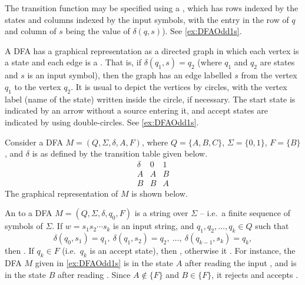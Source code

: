 The transition function may be specified using a , which has rows indexed by the states and columns indexed by the input symbols, with the entry in the row of $q$ and column of $s$ being the value of $\delta(q, s)$). See \cref{ex:DFAOdd1s}.

A DFA has a graphical representation as a directed graph in which each vertex is a state and each edge is a . That is, if $\delta(q_1, s) = q_2$ (where $q_1$ and $q_2$ are states and $s$ is an input symbol), then the graph has an edge labelled $s$ from the vertex $q_1$ to the vertex $q_2$. It is usual to depict the vertices by circles, with the vertex label (name of the state) written inside the circle, if necessary. The start state is indicated by an arrow without a source entering it, and accept states are indicated by using double-circles. See \cref{ex:DFAOdd1s}.

\begin{Example}\label{ex:DFAOdd1s}
Consider a DFA $M = (Q, \Sigma, \delta, A, F)$, where $Q = \{A, B, C\}$, $\Sigma = \{0, 1\}$, $F = \{B\}$, and $\delta$ is as defined by the transition table given below.
\begin{equation*}
\begin{array}{r|cc}
\delta & 0 & 1 \\
\hline
A & A & B \\
B & B & A
\end{array}
\end{equation*}
The graphical representation of $M$ is shown below.
\begin{center}
\end{center}
\end{Example}

An  to a DFA $M = (Q, \Sigma, \delta, q_0, F)$ is a string over $\Sigma$ -- i.e.\ a finite sequence of symbols of $\Sigma$. If $w = s_1 s_2 \cdots s_k$ is an input string, and $q_1, q_2, \ldots, q_k \in Q$ such that
\begin{equation*}
\delta(q_0, s_1) = q_1,~ \delta(q_1, s_2) = q_2,~ \ldots,~ \delta(q_{k-1}, s_k) = q_k,
\end{equation*}
then . If $q_k \in F$ (i.e.\ $q_k$ is an accept state), then , otherwise it . For instance, the DFA $M$ given in \cref{ex:DFAOdd1s} is in the state $A$ after reading the input , and is in the state $B$ after reading . Since $A \notin \{F\}$ and $B \in \{F\}$, it rejects  and accepts .

